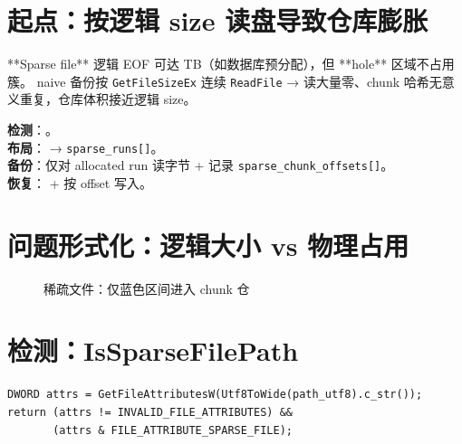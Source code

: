 
\section{起点：按逻辑 size 读盘导致仓库膨胀}

**Sparse file** 逻辑 EOF 可达 TB（如数据库预分配），但 **hole** 区域不占用簇。
 naive 备份按 \texttt{GetFileSizeEx} 连续 \texttt{ReadFile} → 读大量零、chunk 哈希无意义重复，仓库体积接近逻辑 size。

\begin{evolbox}
\textbf{检测}：。\\
\textbf{布局}： → \texttt{sparse\_runs[]}。\\
\textbf{备份}：仅对 allocated run 读字节 + 记录 \texttt{sparse\_chunk\_offsets[]}。\\
\textbf{恢复}： + 按 offset 写入。
\end{evolbox}

\section{问题形式化：逻辑大小 vs 物理占用}

\begin{figure}[htbp]
\centering
{}
\caption{稀疏文件：仅蓝色区间进入 chunk 仓}
\end{figure}

\section{检测：IsSparseFilePath}

\begin{lstlisting}[caption={IsSparseFilePath (sparse\_file.cc)}]
DWORD attrs = GetFileAttributesW(Utf8ToWide(path_utf8).c_str());
return (attrs != INVALID_FILE_ATTRIBUTES) &&
       (attrs & FILE_ATTRIBUTE_SPARSE_FILE);
\end{lstlisting}

